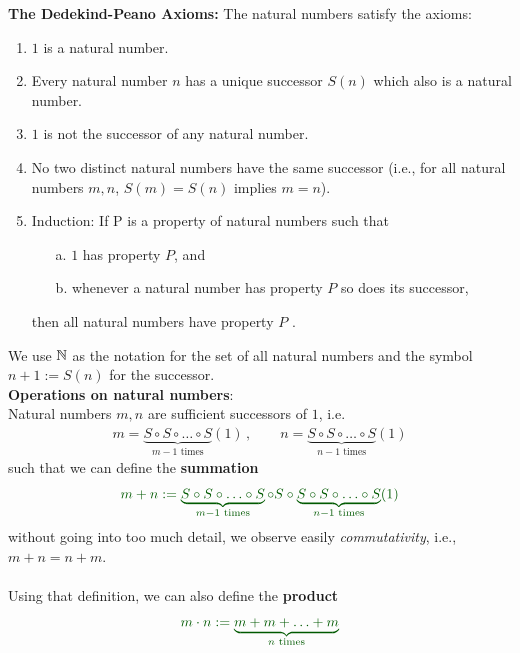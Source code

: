 {	\color{defgruen}
	\textbf{The Dedekind-Peano Axioms:} The natural numbers satisfy the axioms:
	\begin{enumerate} 
		\item $1$ is a natural number.
		\item  Every natural number $n$ has a unique successor $S(n)$ which also is a natural
		number.
		\item  $1$ is not the successor of any natural number.
		\item No two distinct natural numbers have the same successor (i.e., for all natural
		numbers $m, n$, $S(m)= S(n)$ implies $m=n$).
		\item Induction: If P is a property of natural numbers such that
		\begin{itemize}
			\item[a.] $1$ has property $P$, and
			\item[b.] whenever a natural number has property $P$ so does its successor,
		\end{itemize}
		then all natural numbers have property $P$ .
	\end{enumerate}
	We use ${\mathbb{N}}$ as the notation for the set of all natural numbers and the symbol $n+1:=S(n)$ for the successor.
	~\\
	\textbf{Operations on natural numbers}: \\[10pt]
	Natural numbers $m,n$ are sufficient successors of $1$, i.e.
	\begin{align*}
	m=\underbrace{S\circ S\circ \ldots \circ S}_{m-1\text{ times}}(1)\, ,\qquad
	n=\underbrace{S\circ S\circ \ldots \circ S}_{n-1\text{ times}}(1)
	\end{align*}  
	such that we can define the \textbf{summation}
	\begin{align*}\color{defgruen}
	m+n:=\underbrace{S\circ S\circ \ldots \circ S}_{m-1\text{ times}}\circ S\circ \underbrace{S\circ S\circ \ldots \circ S}_{n-1\text{ times}}(1)
	\end{align*}  
	without going into too much detail, we observe easily \textit{commutativity}, i.e., {\color{satzrot}$m+n=n+m$}. 
	~\\~\\
	Using that definition, we can also define the \textbf{product}
	\begin{align*}\color{defgruen}
	m\cdot n:=\underbrace{m+m+\ldots +m}_{n\text{ times}}

\end{align*}}
